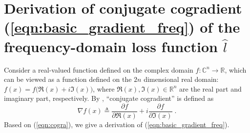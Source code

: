 \documentclass[final]{siamart1116}
\def \R  {\mathbb{R}}
\def \C  {\mathbb{C}}
\begin{document}
\section{Derivation of conjugate cogradient (\ref{eqn:basic_gradient_freq}) of the frequency-domain loss function $\hat{l}$}
\label{app:derivation}

Consider a real-valued function defined on the complex domain $f:\C^n \to \R$, which can be viewed as a function defined on the $2n$ dimensional real domain: $f(x) = f\big(\Re(x) + i \Im(x)\big)$, where $\Re(x), \Im(x) \in \R^n$ are the real part and imaginary part, respectively. By \cite{sorber2012unconstrained}, ``conjugate cogradient'' is defined as
\begin{equation}
\label{eqn:cogra}
\nabla f(x) \triangleq \frac{\partial f}{\partial \Re(x)} + i \frac{\partial f}{\partial \Im(x)} \;.
\end{equation}
Based on (\ref{eqn:cogra}), we give a derivation of (\ref{eqn:basic_gradient_freq}).
\end{document}

